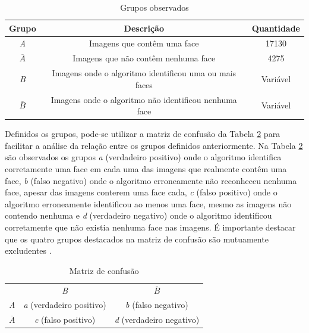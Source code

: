 \begin{table}[htbp]
    \caption{Grupos observados}
    \label{tab:grupos-images}
    \centering
    \begin{tabular}{ccc}\hline\hline
        \textbf{Grupo} & \textbf{Descrição} & \textbf{Quantidade} \\\hline
        \textit{A} & Imagens que contêm uma face & 17130 \\
        $\overline{A}$ & Imagens que não contêm nenhuma face & 4275 \\
        \textit{B} & Imagens onde o algoritmo identificou uma ou mais faces & Variável \\
        $\overline{B}$ & Imagens onde o algoritmo não identificou nenhuma face & Variável \\
    \hline\hline
    \end{tabular}
\end{table}

Definidos os grupos, pode-se utilizar a matriz de confusão da Tabela \ref{tab:matriz_de_confusao} para facilitar a análise da relação entre os grupos definidos anteriormente. Na Tabela \ref{tab:matriz_de_confusao} são observados os grupos \textit{a} (verdadeiro positivo) onde o algoritmo identifica corretamente uma face em cada uma das imagens que realmente contêm uma face, \textit{b} (falso negativo) onde o algoritmo erroneamente não reconheceu nenhuma face, apesar das imagens conterem uma face cada, \textit{c} (falso positivo) onde o algoritmo erroneamente identificou ao menos uma face, mesmo as imagens não contendo nenhuma e \textit{d} (verdadeiro negativo) onde o algoritmo identificou corretamente que não existia nenhuma face nas imagens. É importante destacar que os quatro grupos destacados na matriz de confusão são mutuamente excludentes \cite{Dougherty:2012:PRC:2553126}.

\begin{table}[htbp]
    \caption{Matriz de confusão}
    \label{tab:matriz_de_confusao}
    \centering
    \begin{tabular}{ccc}\hline\hline
        & \textit{B} & $\overline{B}$ \\
    \textit{A} & \textit{a} (verdadeiro positivo) & \textit{b} (falso negativo) \\
    $\overline{A}$ & \textit{c} (falso positivo) & \textit{d} (verdadeiro negativo) \\
    \hline\hline
    \end{tabular}
\end{table}

